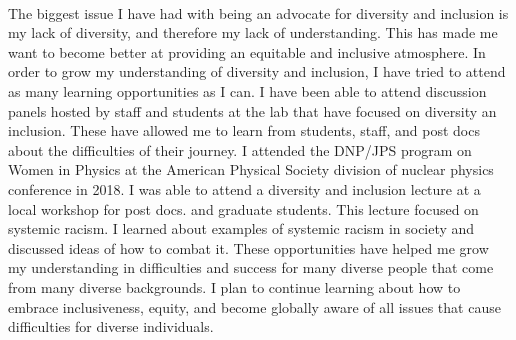 \documentclass[12pt,letterpaper]{article}
\begin{document}
\paragraph{}The biggest issue I have had with being an advocate for diversity and inclusion is my lack of diversity, and therefore my lack of understanding. This has made me want to become better at providing an equitable and inclusive atmosphere. In order to grow my understanding of diversity and inclusion, I have tried to attend as many learning opportunities as I can. I have been able to attend discussion panels hosted by staff and students at the lab that have focused on diversity an inclusion. These have allowed me to learn from students, staff, and post docs about the difficulties of their journey. I attended the DNP/JPS program on Women in Physics at the American Physical Society division of nuclear physics conference in 2018. I was able to attend a diversity and inclusion lecture at a local workshop for post docs. and graduate students. This lecture focused on systemic racism. I learned about examples of systemic racism in society and discussed ideas of how to combat it. These opportunities have helped me grow my understanding in difficulties and success for many diverse people that come from many diverse backgrounds. I plan to continue learning about how to embrace inclusiveness, equity, and become globally aware of all issues that cause difficulties for diverse individuals. 
\end{document}
